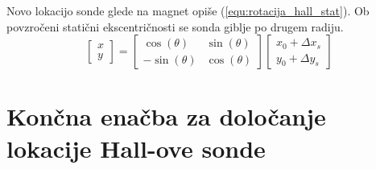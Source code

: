 Novo lokacijo sonde glede na magnet opiše (\ref{equ:rotacija_hall_stat}). Ob povzročeni statični ekscentričnosti se sonda giblje po drugem radiju.
\begin{equation}
\label{equ:rotacija_hall_stat}
\begin{bmatrix} x\\y \end{bmatrix}=
\begin{bmatrix} \cos(\theta)&\sin(\theta)\\-\sin(\theta)&\cos(\theta) \end{bmatrix}
\begin{bmatrix} x_0+\Delta x_s\\y_0+\Delta y_s \end{bmatrix}
\end{equation}







\section{Končna enačba za določanje lokacije Hall-ove sonde}


